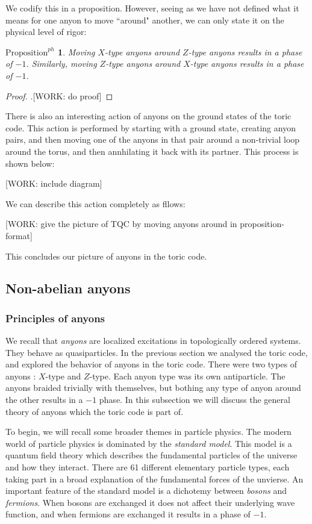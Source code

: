 \documentclass{article}
\newtheorem{propositionph}{$\text{Proposition}^{ph}$}[section]
\theoremstyle{definition}
\numberwithin{figure}{section}
\begin{document}
We codify this in a proposition. However, seeing as we have not defined what it means for one anyon to move ``around" another, we can only state it on the physical level of rigor:

\begin{propositionph} Moving $X$-type anyons around $Z$-type anyons results in a phase of $-1$. Similarly, moving $Z$-type anyons around $X$-type anyons results in a phase of $-1$.
\end{propositionph}
\begin{proof}.[WORK: do proof]
\end{proof}

There is also an interesting action of anyons on the ground states of the toric code. This action is performed by starting with a ground state, creating anyon pairs, and then moving one of the anyons in that pair around a non-trivial loop around the torus, and then annhilating it back with its partner. This process is shown below:

[WORK: include diagram]

We can describe this action completely as fllows:

[WORK: give the picture of TQC by moving anyons around in proposition-format]

This concludes our picture of anyons in the toric code.

\subsection{Non-abelian anyons}

\subsubsection{Principles of anyons}

We recall that \textit{anyons} are localized excitations in topologically ordered systems. They behave as quasiparticles. In the previous section we analysed the toric code, and explored the behavior of anyons in the toric code. There were two types of anyons : $X$-type and $Z$-type. Each anyon type was its own antiparticle. The anyons braided trivially with themselves, but bothing any type of anyon around the other results in a $-1$ phase. In this subsection we will discuss the general theory of anyons which the toric code is part of.

To begin, we will recall some broader themes in particle physics. The modern world of particle physics is dominated by the \textit{standard model}. This model is a quantum field theory which describes the fundamental particles of the universe and how they interact. There are 61 different elementary particle types, each taking part in a broad explanation of the fundamental forces of the unvierse. An important feature of the standard model is a dichotemy between \textit{bosons} and \textit{fermions}. When bosons are exchanged it does not affect their underlying wave function, and when fermions are exchanged it results in a phase of $-1$.
\end{document}
